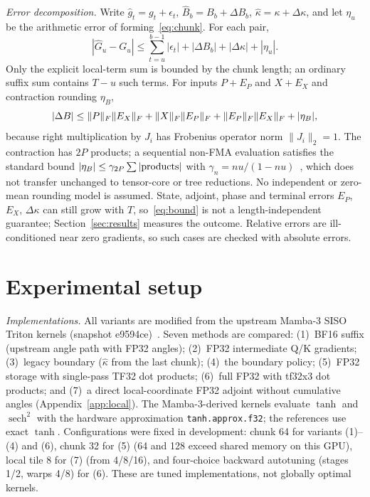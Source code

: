 \emph{Error decomposition.} Write $\widehat g_t=g_t+\epsilon_t$, $\widehat B_b=B_b+\Delta B_b$, $\widehat\kappa=\kappa+\Delta\kappa$, and let $\eta_u$ be the arithmetic error of forming~\eqref{eq:chunk}. For each pair,
\begin{equation}
|\widehat G_u-G_u|\le\sum_{t=u}^{b-1}|\epsilon_t|+|\Delta B_b|+|\Delta\kappa|+|\eta_u|.\label{eq:bound}
\end{equation}
Only the explicit local-term sum is bounded by the chunk length; an ordinary suffix sum contains $T-u$ such terms. For inputs $P+E_P$ and $X+E_X$ and contraction rounding $\eta_B$,
\begin{equation}
|\Delta B|\le\lVert P\rVert_F\lVert E_X\rVert_F+\lVert X\rVert_F\lVert E_P\rVert_F+\lVert E_P\rVert_F\lVert E_X\rVert_F+|\eta_B|,\label{eq:inputerror}
\end{equation}
because right multiplication by $J_i$ has Frobenius operator norm $\|J_i\|_2=1$. The contraction has $2P$ products; a sequential non-FMA evaluation satisfies the standard bound $|\eta_B|\le\gamma_{2P}\sum|{\rm products}|$ with $\gamma_n=nu/(1-nu)$~\cite{higham}, which does not transfer unchanged to tensor-core or tree reductions. No independent or zero-mean rounding model is assumed. State, adjoint, phase and terminal errors $E_P$, $E_X$, $\Delta\kappa$ can still grow with $T$, so~\eqref{eq:bound} is not a length-independent guarantee; Section~\ref{sec:results} measures the outcome. Relative errors are ill-conditioned near zero gradients, so such cases are checked with absolute errors.

\section{Experimental setup}\label{sec:setup}
\emph{Implementations.} All variants are modified from the upstream Mamba-3 SISO Triton kernels (snapshot e9594ce)~\cite{mambacode}. Seven methods are compared: (1)~BF16 suffix (upstream angle path with FP32 angles); (2)~FP32 intermediate Q/K gradients; (3)~legacy boundary ($\widehat\kappa$ from the last chunk); (4)~the boundary policy; (5)~FP32 storage with single-pass TF32 dot products; (6)~full FP32 with tf32x3 dot products; and (7)~a direct local-coordinate FP32 adjoint without cumulative angles (Appendix~\ref{app:local}). The Mamba-3-derived kernels evaluate $\tanh$ and $\operatorname{sech}^2$ with the hardware approximation \texttt{tanh.approx.f32}; the references use exact $\tanh$. Configurations were fixed in development: chunk 64 for variants (1)--(4) and (6), chunk 32 for (5) (64 and 128 exceed shared memory on this GPU), local tile 8 for (7) (from 4/8/16), and four-choice backward autotuning (stages 1/2, warps 4/8) for (6). These are tuned implementations, not globally optimal kernels.


